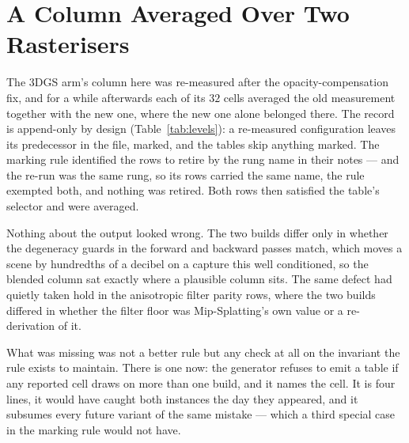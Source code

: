 

\section{A Column Averaged Over Two Rasterisers}
\label{sec:blend}

The 3DGS arm's column here was re-measured after the opacity-compensation fix, and for a while afterwards each of
its $32$ cells averaged the old measurement together with the new one, where the
new one alone belonged there. The record is append-only by design (Table~\ref{tab:levels}): a
re-measured configuration leaves its predecessor in the file, marked, and the
tables skip anything marked. The marking rule identified the rows to retire by
the rung name in their notes --- and the re-run was the same rung, so its rows
carried the same name, the rule exempted both, and nothing was retired. Both
rows then satisfied the table's selector and were averaged.

Nothing about the output looked wrong. The two builds differ only in whether the
degeneracy guards in the forward and backward passes match, which moves a scene
by hundredths of a decibel on a capture this well conditioned, so the blended
column sat exactly where a plausible column sits. The same defect had quietly
taken hold in the anisotropic filter parity rows, where the two builds differed in whether the
filter floor was Mip-Splatting's own value or a re-derivation of it.

What was missing was not a better rule but any check at all on the invariant the
rule exists to maintain. There is one now: the generator refuses to emit a table
if any reported cell draws on more than one build, and it names the cell. It is
four lines, it would have caught both instances the day they appeared, and it
subsumes every future variant of the same mistake --- which a third special case
in the marking rule would not have.



